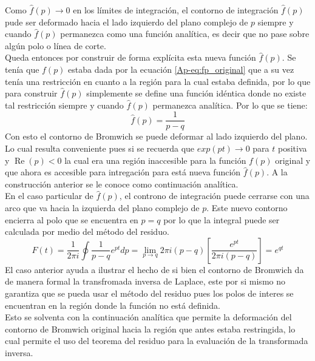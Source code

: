 \documentclass[../tesis_main_file.tex]{subfiles}
\begin{document}
Como $\widehat{f}(p) \rightarrow 0$ en los límites de integración, el contorno de integración $\widehat{f}(p)$ pude ser deformado hacia el lado izquierdo del plano complejo de $p$ siempre y cuando $\widehat{f}(p)$ permanezca como una función analítica, es decir que no pase sobre algún polo o línea de corte.\\
Queda entonces por construir de forma explícita esta nueva función $\widehat{f}(p)$. Se tenía que $f(p)$ estaba dada por la ecuación \ref{Ap-eq:fp_original} que a su vez tenía una restricción en cuanto a la región para la cual estaba definida, por lo que para construir $\widehat{f}(p)$ simplemente se define una función idéntica donde no existe tal restricción siempre y cuando $\widehat{f}(p)$ permanezca analítica. Por lo que se tiene:
\begin{equation}
\widehat{f}(p) = \frac{1}{p-q}
\end{equation}
Con esto el contorno de Bromwich se puede deformar al lado izquierdo del plano. Lo cual resulta conveniente pues si se recuerda que $exp(pt) \rightarrow 0$ para $t$ positiva y $\operatorname{Re}(p) <0$ la cual era una región inaccesible para la función $f(p)$ original y que ahora es accesible para intregación para está nueva función $\widehat{f}(p)$. A la construcción anterior se le conoce como continuación analítica.\\
En el caso particular de $\widehat{f}(p)$, el controno de integración puede cerrarse con una arco que va hacia la izquierda del plano complejo de $p$. Este nuevo contorno encierra al polo que se encuentra en $p=q$ por lo que la integral puede ser calculada por medio del método del residuo.
\begin{equation}
F(t) =\frac{1}{2\pi i}\oint \frac{1}{p-q}e^{pt}dp= \lim_{p\to q}2\pi i(p-q)\left[\frac{e^{pt}}{2\pi i (p-q)}\right]=e^{qt}
\end{equation}
El caso anterior ayuda a ilustrar el hecho de si bien el contorno de Bromwich da de manera formal la transfromada inversa de Laplace, este por si mismo no garantiza que se pueda usar el método del residuo pues los polos de interes se encuentran en la región donde la función no está definida.\\
Esto se solventa con la continuación analítica que permite la deformación del contorno de Bromwich original hacia la región que antes estaba restringida, lo cual permite el uso del teorema del residuo para la evaluación de la transformada inversa.
\onlyinsubfile{}
\onlyinsubfile{}
\end{document}
